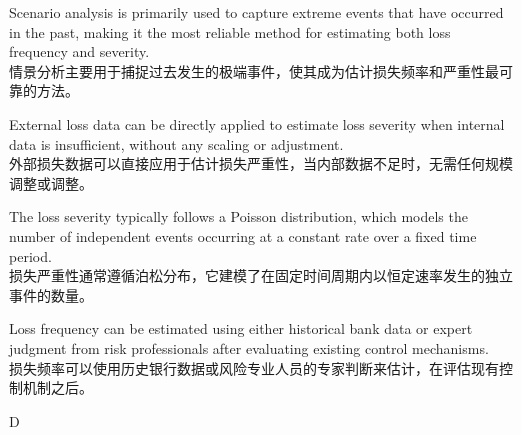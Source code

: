 \documentclass{article}
\begin{document}
                \begin{choices}
                    \item Scenario analysis is primarily used to capture extreme events that have occurred in the past, making it the most reliable method for estimating both loss frequency and severity.
                    \\情景分析主要用于捕捉过去发生的极端事件，使其成为估计损失频率和严重性最可靠的方法。
                    \item External loss data can be directly applied to estimate loss severity when internal data is insufficient, without any scaling or adjustment.
                    \\外部损失数据可以直接应用于估计损失严重性，当内部数据不足时，无需任何规模调整或调整。
                    \item The loss severity typically follows a Poisson distribution, which models the number of independent events occurring at a constant rate over a fixed time period.
                    \\损失严重性通常遵循泊松分布，它建模了在固定时间周期内以恒定速率发生的独立事件的数量。
                    \item Loss frequency can be estimated using either historical bank data or expert judgment from risk professionals after evaluating existing control mechanisms.
                    \\损失频率可以使用历史银行数据或风险专业人员的专家判断来估计，在评估现有控制机制之后。
                \end{choices}
                
                \begin{correctanswer}
                D
                \end{correctanswer}
                
\end{document}
